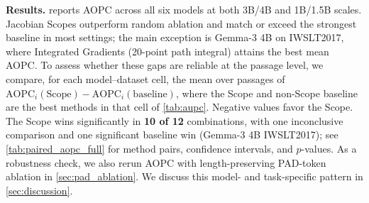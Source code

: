\documentclass{article}
\begin{document}
\noindent\textbf{Results.}
 reports AOPC across all six models at both 3B/4B and 1B/1.5B scales.
Jacobian Scopes outperform random ablation and match or exceed the strongest baseline in most settings; the main exception is Gemma-3 4B on IWSLT2017, where Integrated Gradients (20-point path integral) attains the best mean AOPC.
To assess whether these gaps are reliable at the passage level, we compare, for each model--dataset cell, the mean over passages of
$\mathrm{AOPC}_i(\mathrm{Scope})-\mathrm{AOPC}_i(\mathrm{baseline})$,
where the Scope and non-Scope baseline are the best methods in that cell of \cref{tab:aupc}.
Negative values favor the Scope.
The Scope wins significantly in \textbf{10 of 12} combinations, with one inconclusive comparison and one significant baseline win (Gemma-3 4B IWSLT2017); see \cref{tab:paired_aopc_full} for method pairs, confidence intervals, and $p$-values.
As a robustness check, we also rerun AOPC with length-preserving PAD-token ablation in \cref{sec:pad_ablation}.
We discuss this model- and task-specific pattern in \cref{sec:discussion}.
\end{document}
